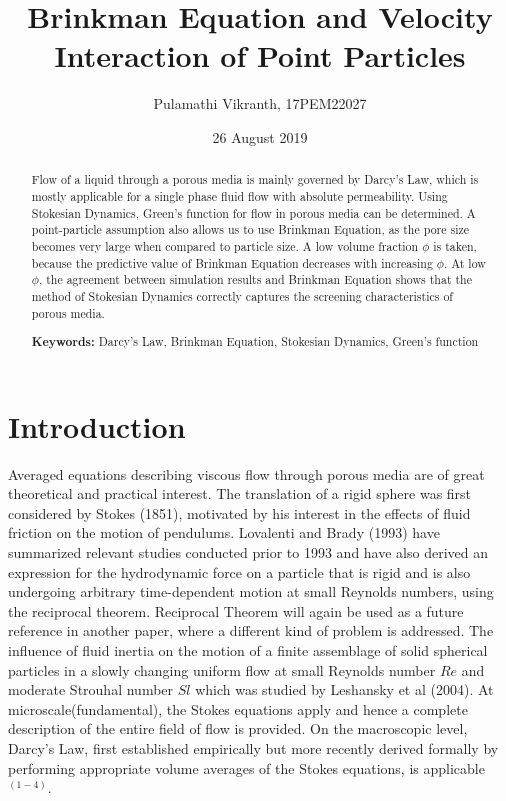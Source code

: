 \documentclass[12pt]{article}
\begin{document}
\cleardoublepage





\tableofcontents
\thispagestyle{empty}
\cleardoublepage



\setcounter{page}{1}

\title{Brinkman Equation and Velocity Interaction of Point Particles}
\author{Pulamathi Vikranth,  17PEM22027}
\date{26 August 2019}
\maketitle

\begin{abstract}
Flow of a liquid through a porous media is mainly governed by Darcy's Law, which is mostly applicable for a single phase fluid flow with absolute permeability. Using Stokesian Dynamics, Green's function for flow in porous media can be determined. A point-particle assumption also allows us to use Brinkman Equation, as the pore size becomes very large when compared to particle size. A low volume fraction $\phi$ is taken, because the predictive value of Brinkman Equation decreases with increasing $\phi$. At low $\phi$, the agreement between simulation results and Brinkman Equation shows that the method of Stokesian Dynamics correctly captures the screening characteristics of porous media. 

\textbf{Keywords:} Darcy's Law, Brinkman Equation, Stokesian Dynamics, Green's function

\end{abstract}

\section{Introduction}
Averaged equations describing viscous flow through porous media are of great theoretical and practical interest.  The translation of a rigid sphere was first considered by Stokes (1851), motivated by his interest in the effects of fluid friction on the motion of pendulums. Lovalenti and Brady (1993) have summarized relevant studies conducted prior to 1993 and have also derived an expression for the hydrodynamic force on a particle that is rigid and is also undergoing arbitrary time-dependent motion at small Reynolds numbers, using the reciprocal theorem. Reciprocal Theorem will again be used as a future reference in another paper, where a different kind of problem is addressed. The influence of fluid inertia on the motion of a finite assemblage of solid spherical particles in a slowly changing uniform flow at small Reynolds number $Re$ and moderate Strouhal number $Sl$ which was studied by Leshansky et al (2004). At microscale(fundamental), the Stokes equations apply and hence a complete description of the entire field of flow is provided. On the macroscopic level, Darcy's Law, first established empirically but more recently derived formally by performing appropriate volume averages of the Stokes equations, is applicable$^{(1-4)}$. 
\end{document}

